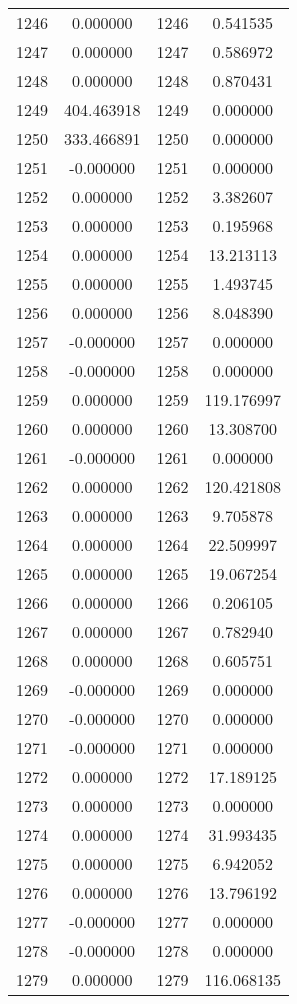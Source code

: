\documentclass[12pt]{article}
\begin{document}
\begin{longtable}{@{}cccc@{}}
1246 & 0.000000 & 1246 & 0.541535 \\
1247 & 0.000000 & 1247 & 0.586972 \\
1248 & 0.000000 & 1248 & 0.870431 \\
1249 & 404.463918 & 1249 & 0.000000 \\
1250 & 333.466891 & 1250 & 0.000000 \\
1251 & -0.000000 & 1251 & 0.000000 \\
1252 & 0.000000 & 1252 & 3.382607 \\
1253 & 0.000000 & 1253 & 0.195968 \\
1254 & 0.000000 & 1254 & 13.213113 \\
1255 & 0.000000 & 1255 & 1.493745 \\
1256 & 0.000000 & 1256 & 8.048390 \\
1257 & -0.000000 & 1257 & 0.000000 \\
1258 & -0.000000 & 1258 & 0.000000 \\
1259 & 0.000000 & 1259 & 119.176997 \\
1260 & 0.000000 & 1260 & 13.308700 \\
1261 & -0.000000 & 1261 & 0.000000 \\
1262 & 0.000000 & 1262 & 120.421808 \\
1263 & 0.000000 & 1263 & 9.705878 \\
1264 & 0.000000 & 1264 & 22.509997 \\
1265 & 0.000000 & 1265 & 19.067254 \\
1266 & 0.000000 & 1266 & 0.206105 \\
1267 & 0.000000 & 1267 & 0.782940 \\
1268 & 0.000000 & 1268 & 0.605751 \\
1269 & -0.000000 & 1269 & 0.000000 \\
1270 & -0.000000 & 1270 & 0.000000 \\
1271 & -0.000000 & 1271 & 0.000000 \\
1272 & 0.000000 & 1272 & 17.189125 \\
1273 & 0.000000 & 1273 & 0.000000 \\
1274 & 0.000000 & 1274 & 31.993435 \\
1275 & 0.000000 & 1275 & 6.942052 \\
1276 & 0.000000 & 1276 & 13.796192 \\
1277 & -0.000000 & 1277 & 0.000000 \\
1278 & -0.000000 & 1278 & 0.000000 \\
1279 & 0.000000 & 1279 & 116.068135 \\

\end{longtable}
\end{document}
